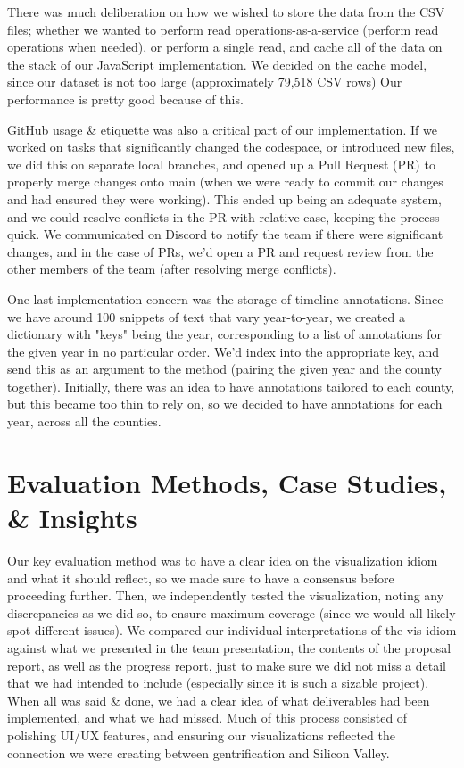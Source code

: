 \documentclass{article}
\begin{document}
    There was much deliberation on how we wished to store the data from the CSV files; whether we wanted to perform read operations-as-a-service (perform read operations when needed), or perform a single read, and cache all of the data on the stack of our JavaScript implementation. We decided on the cache model, since our dataset is not too large (approximately 79,518 CSV rows) Our performance is pretty good because of this.
    
    GitHub usage \& etiquette was also a critical part of our implementation. If we worked on tasks that significantly changed the codespace, or introduced new files, we did this on separate local branches, and opened up a Pull Request (PR) to properly merge changes onto main (when we were ready to commit our changes and had ensured they were working). This ended up being an adequate system, and we could resolve conflicts in the PR with relative ease, keeping the process quick. We communicated on Discord to notify the team if there were significant changes, and in the case of PRs, we'd open a PR and request review from the other members of the team (after resolving merge conflicts).

    One last implementation concern was the storage of timeline annotations. Since we have around 100 snippets of text that vary year-to-year, we created a dictionary with "keys" being the year, corresponding to a list of annotations for the given year in no particular order. We'd index into the appropriate key, and send this as an argument to the method (pairing the given year and the county together). Initially, there was an idea to have annotations tailored to each county, but this became too thin to rely on, so we decided to have annotations for each year, across all the counties. 

\section{Evaluation Methods, Case Studies, \& Insights}
 
    Our key evaluation method was to have a clear idea on the visualization idiom and what it should reflect, so we made sure to have a consensus before proceeding further. Then, we independently tested the visualization, noting any discrepancies as we did so, to ensure maximum coverage (since we would all likely spot different issues). We compared our individual interpretations of the vis idiom against what we presented in the team presentation, the contents of the proposal report, as well as the progress report, just to make sure we did not miss a detail that we had intended to include (especially since it is such a sizable project). When all was said \& done, we had a clear idea of what deliverables had been implemented, and what we had missed. Much of this process consisted of polishing UI/UX features, and ensuring our visualizations reflected the connection we were creating between gentrification and Silicon Valley.
    
\end{document}
